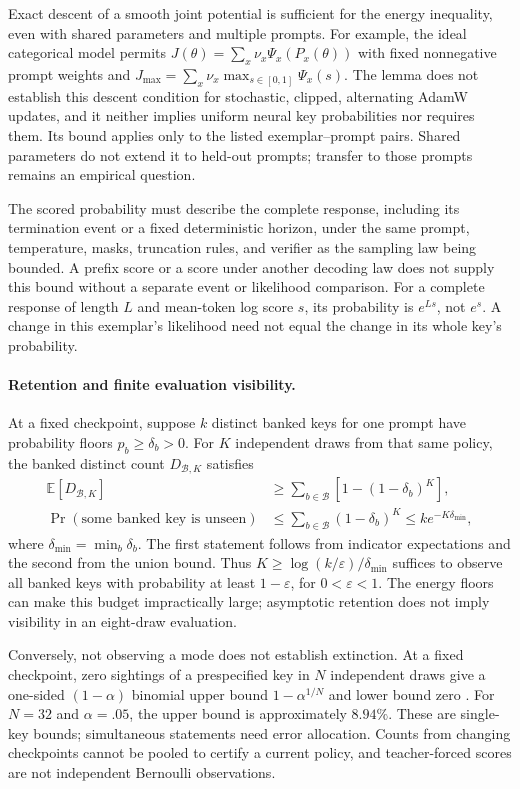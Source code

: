 \documentclass{article}
\newcommand{\1}{\mathbf 1}
\theoremstyle{remark}
\theoremstyle{definition}
\theoremstyle{plain}
\begin{document}
Exact descent of a smooth joint potential is sufficient for the energy
inequality, even with shared parameters and multiple prompts. For example,
the ideal categorical model permits
$J(\theta)=\sum_x\nu_x\Psi_x(P_x(\theta))$ with fixed nonnegative prompt
weights and $J_{\max}=\sum_x\nu_x\max_{s\in[0,1]}\Psi_x(s)$. The lemma does not establish
this descent condition for stochastic, clipped, alternating AdamW updates,
and it neither implies uniform neural key probabilities nor requires them.
Its bound applies only to the listed exemplar--prompt pairs. Shared
parameters do not extend it to held-out prompts; transfer to those prompts
remains an empirical question.

The scored probability must describe the complete response, including its
termination event or a fixed deterministic horizon, under the same prompt,
temperature, masks, truncation rules, and verifier as the sampling law being
bounded. A prefix score or a score under another decoding law does not
supply this bound without a separate event or likelihood comparison.
For a complete response of length $L$ and mean-token log score $s$, its
probability is $e^{Ls}$, not $e^s$. A change in this exemplar's likelihood
need not equal the change in its whole key's probability.

\paragraph{Retention and finite evaluation visibility.}
At a fixed checkpoint, suppose $k$ distinct banked keys for one prompt have
probability floors $p_b\ge\delta_b>0$. For $K$ independent draws from that
same policy, the banked distinct count $D_{\mathcal B,K}$ satisfies
\[
 \begin{aligned}
 \mathbb E[D_{\mathcal B,K}]
 &\ge\sum_{b\in\mathcal B}\left[1-(1-\delta_b)^K\right],\\
 \Pr(\text{some banked key is unseen})
 &\le\sum_{b\in\mathcal B}(1-\delta_b)^K
 \le k e^{-K\delta_{\min}},
 \end{aligned}
\]
where $\delta_{\min}=\min_b\delta_b$. The first statement follows from
indicator expectations and the second from the union bound. Thus
$K\ge\log(k/\varepsilon)/\delta_{\min}$ suffices to observe all banked keys
with probability at least $1-\varepsilon$, for $0<\varepsilon<1$.
The energy floors can make this budget impractically large; asymptotic
retention does not imply visibility in an eight-draw evaluation.

Conversely, not observing a mode does not establish extinction. At a fixed
checkpoint, zero sightings of a prespecified key in $N$ independent draws
give a one-sided $(1-\alpha)$ binomial upper bound
$1-\alpha^{1/N}$ and lower bound zero \citep{clopper1934binomial}. For
$N=32$ and $\alpha=.05$, the upper bound is approximately $8.94\%$.
These are single-key bounds; simultaneous statements need error allocation.
Counts from changing checkpoints cannot be pooled to certify a current
policy, and teacher-forced scores are not independent Bernoulli observations.
\end{document}
